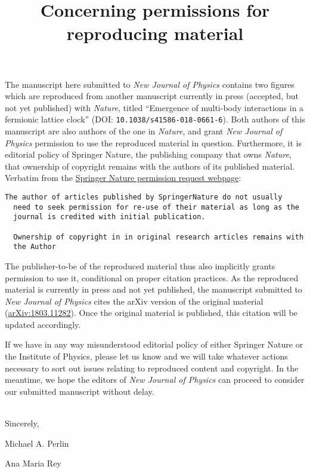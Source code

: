 \documentclass[nofootinbib,notitlepage,11pt]{revtex4-1}
\begin{document}
\title{Concerning permissions for reproducing material}

\maketitle
\thispagestyle{fancy}

The manuscript here submitted to {\it New Journal of Physics} contains
two figures which are reproduced from another manuscript currently in
press (accepted, but not yet published) with {\it Nature}, titled
``Emergence of multi-body interactions in a fermionic lattice clock''
(DOI: \verb|10.1038/s41586-018-0661-6|).  Both authors of this
manuscript are also authors of the one in {\it Nature}, and grant {\it
  New Journal of Physics} permission to use the reproduced material in
question.  Furthermore, it is editorial policy of Springer Nature, the
publishing company that owns {\it Nature}, that ownership of copyright
remains with the authors of its published material.  Verbatim from the
\href{https://www.nature.com/reprints/permission-requests.html}{Springer
  Nature permission request webpage}:
\begin{lstlisting}[breaklines]
  The author of articles published by SpringerNature do not usually
  need to seek permission for re-use of their material as long as the
  journal is credited with initial publication.

  Ownership of copyright in in original research articles remains with
  the Author
\end{lstlisting}
The publisher-to-be of the reproduced material thus also implicitly
grants permission to use it, conditional on proper citation practices.
As the reproduced material is currently in press and not yet
published, the manuscript submitted to {\it New Journal of Physics}
cites the arXiv version of the original material
(\href{https://arxiv.org/abs/1803.11282}{arXiv:1803.11282}).  Once the
original material is published, this citation will be updated
accordingly.

If we have in any way misunderstood editorial policy of either
Springer Nature or the Institute of Physics, please let us know and we
will take whatever actions necessary to sort out issues relating to
reproduced content and copyright.  In the meantime, we hope the
editors of {\it New Journal of Physics} can proceed to consider our
submitted manuscript without delay.

~\\

Sincerely,

Michael A. Perlin

Ana Maria Rey
\end{document}
